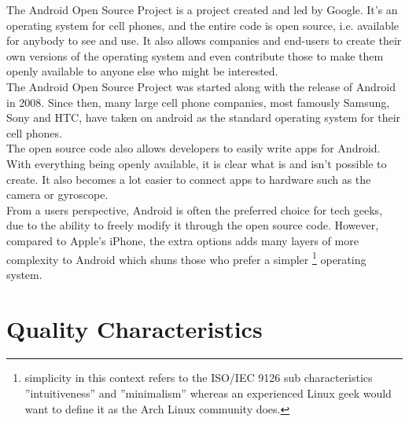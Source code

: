 \documentclass[conference]{IEEEtran}
\begin{document}
The Android Open Source Project is a project created and led by Google. It's an operating system for cell phones, and the entire code is open source, i.e. available for anybody to see and use. It also allows companies and end-users to create their own versions of the operating system and even contribute those to make them openly available to anyone else who might be interested.\cite{android} 
\\The Android Open Source Project was started along with the release of Android in 2008. Since then, many large cell phone companies, most famously Samsung, Sony and HTC, have taken on android as the standard operating system for their cell phones. 
\\The open source code also allows developers to easily write apps for Android. With everything being openly available, it is clear what is and isn't possible to create. It also becomes a lot easier to connect apps to hardware such as the camera or gyroscope.
\\From a users perspective, Android is often the preferred choice for tech geeks, due to the ability to freely modify it through the open source code. However, compared to Apple's iPhone, the extra options adds many layers of more complexity to Android which shuns those who prefer a simpler \footnote{simplicity in this context refers to the ISO/IEC 9126\cite{jung2004} sub characteristics ''intuitiveness'' and ''minimalism'' whereas an experienced Linux geek would want to define it as the Arch Linux community does.\cite{archway}} operating system. 


\section{Quality Characteristics}
\label{quality}
\end{document}
